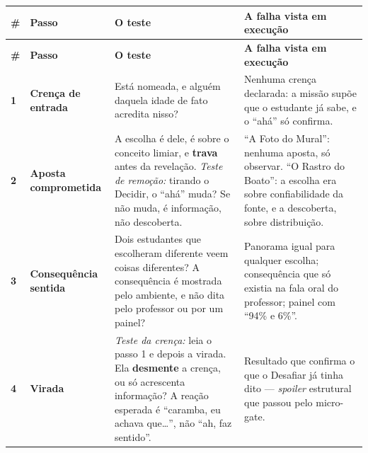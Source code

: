 \documentclass[11pt,a4paper]{article}
\begin{document}
\begin{center}
\begin{longtable}{p{0.55cm}p{3.0cm}p{5.6cm}p{5.4cm}}
\toprule
\multicolumn{1}{l}{\sffamily\bfseries\footnotesize\color{unLavanda}\#} & \multicolumn{1}{l}{\sffamily\bfseries\footnotesize\color{unNavy}Passo} & \multicolumn{1}{l}{\sffamily\bfseries\footnotesize\color{unNavy}O teste} & \multicolumn{1}{l}{\sffamily\bfseries\footnotesize\color{unNavy}A falha vista em execução} \\
\midrule
\endfirsthead
\toprule
\multicolumn{1}{l}{\sffamily\bfseries\footnotesize\color{unLavanda}\#} & \multicolumn{1}{l}{\sffamily\bfseries\footnotesize\color{unNavy}Passo} & \multicolumn{1}{l}{\sffamily\bfseries\footnotesize\color{unNavy}O teste} & \multicolumn{1}{l}{\sffamily\bfseries\footnotesize\color{unNavy}A falha vista em execução} \\
\midrule
\endhead
\sffamily\bfseries\color{unLavanda}1 & \sffamily\bfseries\footnotesize\color{unNavy}Crença de entrada & \footnotesize Está nomeada, e alguém daquela idade de fato acredita nisso? & \footnotesize Nenhuma crença declarada: a missão supõe que o estudante já sabe, e o ``ahá'' só confirma. \\
\addlinespace
\sffamily\bfseries\color{unLavanda}2 & \sffamily\bfseries\footnotesize\color{unNavy}Aposta comprometida & \footnotesize A escolha é dele, é sobre o conceito limiar, e \textbf{trava} antes da revelação. \emph{Teste de remoção:} tirando o Decidir, o ``ahá'' muda? Se não muda, é informação, não descoberta. & \footnotesize ``A Foto do Mural'': nenhuma aposta, só observar. ``O Rastro do Boato'': a escolha era sobre confiabilidade da fonte, e a descoberta, sobre distribuição. \\
\addlinespace
\sffamily\bfseries\color{unLavanda}3 & \sffamily\bfseries\footnotesize\color{unNavy}Consequência sentida & \footnotesize Dois estudantes que escolheram diferente veem coisas diferentes? A consequência é mostrada pelo ambiente, e não dita pelo professor ou por um painel? & \footnotesize Panorama igual para qualquer escolha; consequência que só existia na fala oral do professor; painel com ``94\% e 6\%''. \\
\addlinespace
\sffamily\bfseries\color{unLavanda}4 & \sffamily\bfseries\footnotesize\color{unNavy}Virada & \footnotesize \emph{Teste da crença:} leia o passo 1 e depois a virada. Ela \textbf{desmente} a crença, ou só acrescenta informação? A reação esperada é ``caramba, eu achava que\ldots'', não ``ah, faz sentido''. & \footnotesize Resultado que confirma o que o Desafiar já tinha dito --- \emph{spoiler} estrutural que passou pelo micro-gate. \\

\end{longtable}
\end{center}
\end{document}
